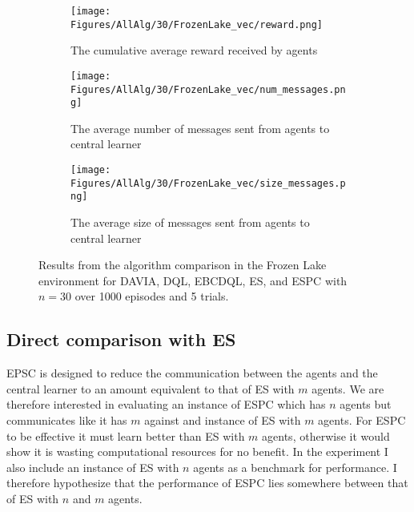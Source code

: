 \begin{figure}[H]
    \centering
    \begin{subfigure}{0.5\textwidth}
        \centering
        \texttt{[image: Figures/AllAlg/30/FrozenLake\_vec/reward.png]}
        \caption{The cumulative average reward received by agents}
        \label{fig:AlgsFLReward}
    \end{subfigure}
    \begin{subfigure}{0.5\textwidth}
        \centering
        \texttt{[image: Figures/AllAlg/30/FrozenLake\_vec/num\_messages.png]}
        \caption{The average number of messages sent from agents to central learner}
        \label{fig:AlgsFLNumMessages}
    \end{subfigure}
    \begin{subfigure}{0.5\textwidth}
        \centering
        \texttt{[image: Figures/AllAlg/30/FrozenLake\_vec/size\_messages.png]}
        \caption{The average size of messages sent from agents to central learner}
        \label{fig:AlgsFLSizeMessages}
    \end{subfigure}
    \caption{Results from the algorithm comparison in the Frozen Lake environment for DAVIA, DQL, EBCDQL, ES, and ESPC with $n=30$ over 1000 episodes and 5 trials.}
    \label{fig:AlgsFL}
\end{figure}



\subsection{Direct comparison with ES}
EPSC is designed to reduce the communication between the agents and the central learner to an amount equivalent to that of ES with $m$ agents. 
We are therefore interested in evaluating an instance of ESPC which has $n$ agents but communicates like it has $m$ against and instance of ES with $m$ agents. 
For ESPC to be effective it must learn better than ES with $m$ agents, otherwise it would show it is wasting computational resources for no benefit. 
In the experiment I also include an instance of ES with $n$ agents as a benchmark for performance. 
I therefore hypothesize that the performance of ESPC lies somewhere between that of ES with $n$ and $m$ agents.


